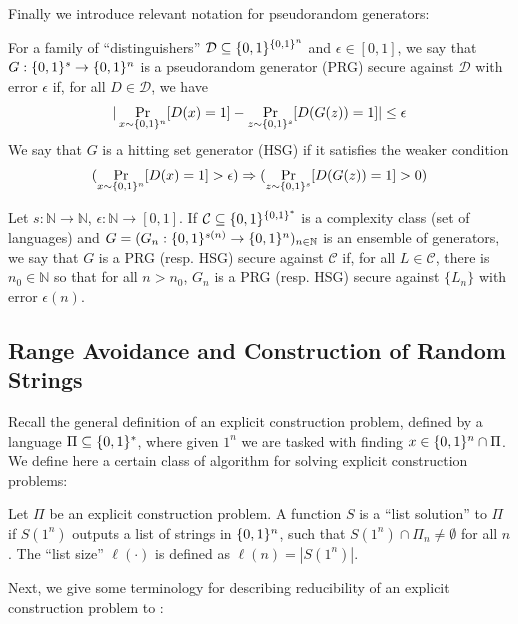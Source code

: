 Finally we introduce relevant notation for pseudorandom generators:

\begin{definition}
For a family of ``distinguishers'' $\mathcal{D} \subseteq \{0,1\}^{\{0,1\}^n}$ and $\epsilon \in [0,1]$, we say that $G: \{0,1\}^s \to \{0,1\}^n$ is a pseudorandom generator (PRG) secure against $\mathcal{D}$ with error $\epsilon$ if, for all $D \in \mathcal{D}$, we have
\[
|\Pr_{x \sim \{0,1\}^n}[D(x)=1] - \Pr_{z \sim \{0,1\}^s}[D(G(z)) = 1]| \leq \epsilon
\]
We say that $G$ is a hitting set generator (HSG) if it satisfies the weaker condition
\[
(\Pr_{x \sim \{0,1\}^n}[D(x)=1] > \epsilon) \Rightarrow  (\Pr_{z \sim \{0,1\}^s}[D(G(z)) = 1]>0)
\]

Let $s: \mathbb{N} \to \mathbb{N}$, $\epsilon: \mathbb{N} \to [0,1]$. If $\mathcal{C} \subseteq \{0,1\}^{\{0,1\}^*}$ is a complexity class (set of languages) and $G = (G_n: \{0,1\}^{s(n)} \to \{0,1\}^{n})_{n \in \mathbb{N}}$ is an ensemble of generators, we say that $G$ is a PRG (resp. HSG) secure against $\mathcal{C}$ if, for all $L \in \mathcal{C}$, there is $n_0 \in \mathbb{N}$ so that for all $n > n_0$, $G_n$ is a PRG (resp. HSG) secure against $\{L_n\}$ with error $\epsilon(n)$.
\end{definition}


\subsection{Range Avoidance and Construction of Random Strings}

Recall the general definition of an explicit construction problem, defined by a language $\Pi \subseteq \{0,1\}^*$, where given $1^n$ we are tasked with finding $x \in \{0,1\}^n \cap \Pi$. We define here a certain class of algorithm for solving explicit construction problems:
\begin{definition}[List Solution]
Let $\Pi$ be an explicit construction problem. A function $S$ is a ``list solution'' to $\Pi$ if $S(1^n) $ outputs a list of strings in $\{0,1\}^n$, such that $S(1^n) \cap \Pi_n \neq \emptyset$ for all $n$. The ``list size'' $\ell(\cdot)$ is defined as $\ell(n) = |S(1^n)|$.
\end{definition}

Next, we give some terminology for describing reducibility of an explicit construction problem to \avoid:

